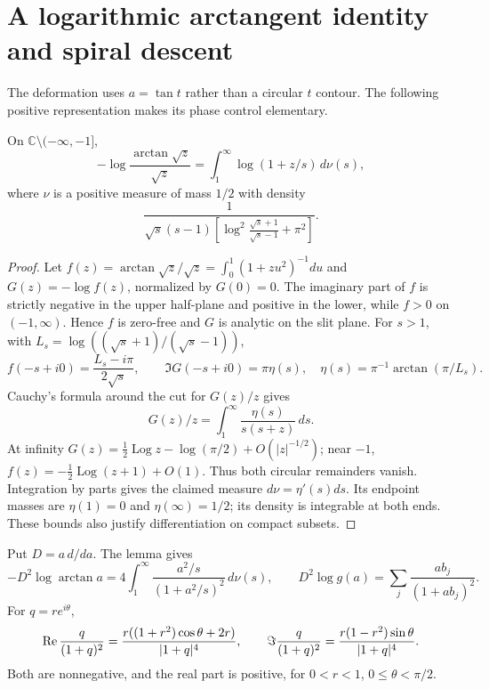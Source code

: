 \documentclass[11pt,a4paper]{article}
\newcommand{\Log}{\operatorname{Log}}
\begin{document}
\section{A logarithmic arctangent identity and spiral descent}
The deformation uses $a=\tan t$ rather than a circular $t$ contour. The following positive representation makes its phase control elementary.
\begin{lemma}\label{lem:atan}
On $\mathbb C\setminus(-\infty,-1]$,
\[
 -\log\frac{\arctan\sqrt z}{\sqrt z}
   =\int_1^\infty\log(1+z/s)\,d\nu(s),
\]
where $\nu$ is a positive measure of mass $1/2$ with density
\[
 \frac{1}{\sqrt s(s-1)
 \left[\log^2\!\frac{\sqrt s+1}{\sqrt s-1}+\pi^2\right]}.
\]
\end{lemma}
\begin{proof}
Let $f(z)=\arctan\sqrt z/\sqrt z=\int_0^1(1+zu^2)^{-1}du$ and $G(z)=-\log f(z)$, normalized by $G(0)=0$. The imaginary part of $f$ is strictly negative in the upper half-plane and positive in the lower, while $f>0$ on $(-1,\infty)$. Hence $f$ is zero-free and $G$ is analytic on the slit plane.
For $s>1$, with $L_s=\log((\sqrt s+1)/(\sqrt s-1))$,
\[
 f(-s+i0)=\frac{L_s-i\pi}{2\sqrt s},\qquad
 \Im G(-s+i0)=\pi\eta(s),\quad
 \eta(s)=\pi^{-1}\arctan(\pi/L_s).
\]
Cauchy's formula around the cut for $G(z)/z$ gives
\[
 G(z)/z=\int_1^\infty\frac{\eta(s)}{s(s+z)}\,ds.
\]
At infinity $G(z)=\tfrac12\Log z-\log(\pi/2)+O(|z|^{-1/2})$; near $-1$, $f(z)=-\tfrac12\Log(z+1)+O(1)$. Thus both circular remainders vanish. Integration by parts gives the claimed measure $d\nu=\eta'(s)ds$. Its endpoint masses are $\eta(1)=0$ and $\eta(\infty)=1/2$; its density is integrable at both ends. These bounds also justify differentiation on compact subsets.
\end{proof}
Put $D=a\,d/da$. The lemma gives
\[
 -D^2\log\arctan a=4\int_1^\infty
       \frac{a^2/s}{(1+a^2/s)^2}\,d\nu(s),\qquad
 D^2\log g(a)=\sum_j\frac{ab_j}{(1+ab_j)^2}.
\]
For $q=re^{i\theta}$,
\[
 \operatorname{Re}\frac q{(1+q)^2}
 =\frac{r((1+r^2)\cos\theta+2r)}{|1+q|^4},\qquad
 \Im\frac q{(1+q)^2}
 =\frac{r(1-r^2)\sin\theta}{|1+q|^4}.
\]
Both are nonnegative, and the real part is positive, for $0<r<1$, $0\le\theta<\pi/2$.
\end{document}
